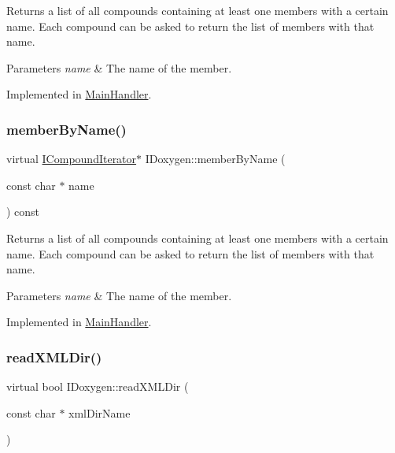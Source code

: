 Returns a list of all compounds containing at least one members with a certain name. Each compound can be asked to return the list of members with that name. 
\begin{DoxyParams}{Parameters}
{\em name} & The name of the member. \\
\hline
\end{DoxyParams}


Implemented in \mbox{\hyperlink{class_main_handler_a1fe4393d8d5c1c3d95d3a233ab80417a}{Main\+Handler}}.

\mbox{\label{class_i_doxygen_a1895a0347469d6e4788da0beca0e071c}} 
\subsubsection{\texorpdfstring{memberByName()}{memberByName()}\hspace{0.1cm}{\footnotesize\ttfamily [2/2]}}
{\footnotesize\ttfamily virtual \mbox{\hyperlink{class_i_compound_iterator}{I\+Compound\+Iterator}}$\ast$ I\+Doxygen\+::member\+By\+Name (\begin{DoxyParamCaption}\item[{const char $\ast$}]{name }\end{DoxyParamCaption}) const\hspace{0.3cm}{\ttfamily [pure virtual]}}

Returns a list of all compounds containing at least one members with a certain name. Each compound can be asked to return the list of members with that name. 
\begin{DoxyParams}{Parameters}
{\em name} & The name of the member. \\
\hline
\end{DoxyParams}


Implemented in \mbox{\hyperlink{class_main_handler_a1fe4393d8d5c1c3d95d3a233ab80417a}{Main\+Handler}}.

\mbox{\label{class_i_doxygen_a7959d93fba77caddee37b6d8370c10f0}} 
\subsubsection{\texorpdfstring{readXMLDir()}{readXMLDir()}\hspace{0.1cm}{\footnotesize\ttfamily [1/2]}}
{\footnotesize\ttfamily virtual bool I\+Doxygen\+::read\+X\+M\+L\+Dir (\begin{DoxyParamCaption}\item[{const char $\ast$}]{xml\+Dir\+Name }\end{DoxyParamCaption})\hspace{0.3cm}{\ttfamily [pure virtual]}}

